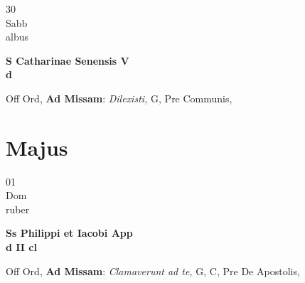 \documentclass[10pt, openany]{book}
\begin{document}
        \begin{center}
            \begin{minipage}{3.5in}
                \vspace{2em}
                \begin{minipage}{0.5in}
                    {\Huge 30} \\
                    {\normalsize Sabb} \\
                    {\normalsize albus}
                \end{minipage}
                \begin{minipage}{3.0in}
                    \textbf{ \large S Catharinae Senensis V \\
                    \textnormal{\normalsize d}} \\ 
                \end{minipage}
                \begin{justify}Off Ord, \textbf{Ad Missam}: \textit{Dilexisti,} G, Pre Communis,   
                \end{justify}
            \end{minipage}
        \end{center}
    
        \chapter{Majus}
                        
        \begin{center}
            \begin{minipage}{3.5in}
                \vspace{2em}
                \begin{minipage}{0.5in}
                    {\Huge 01} \\
                    {\normalsize Dom} \\
                    {\normalsize ruber}
                \end{minipage}
                \begin{minipage}{3.0in}
                    \textbf{ \large Ss Philippi et Iacobi App \\
                    \textnormal{\normalsize d II cl}} \\ 
                \end{minipage}
                \begin{justify}Off Ord, \textbf{Ad Missam}: \textit{Clamaverunt ad te,} G, C, Pre De Apostolis,   
                \end{justify}
            \end{minipage}
        \end{center}
    
\end{document}
